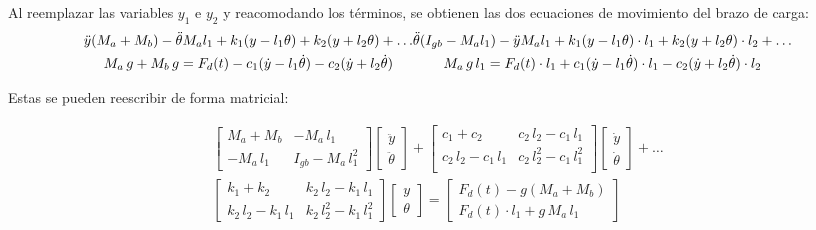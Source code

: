 \newpage

Al reemplazar las variables $y_1$ e $y_2$ y reacomodando los términos, se obtienen las dos ecuaciones de movimiento del brazo de carga:
\begin{subequations}
\begin{multline}\label{eq:mov_y}
	\ddot{y}(M_a + M_b) - \ddot{\theta}M_al_1 + k_1(y - l_1\theta) + k_2(y + l_2\theta) + \dots \\
	 M_a\, g + M_b\, g = F_d(t) - c_1(\dot{y} - l_1\dot{\theta}) - c_2(\dot{y} + l_2\dot{\theta}) 
\end{multline} 
\vspace{-17mm}
\begin{multline}\label{eq:mov_theta}
	\ddot{\theta}(I_{gb} - M_al_1) - \ddot{y}M_al_1 + k_1(y - l_1\theta)\cdot l_1 + k_2(y + l_2\theta)\cdot l_2 + \dots \\
	M_a\, g\, l_1 = F_d(t)\cdot l_1 + c_1(\dot{y} - l_1\dot{\theta})\cdot l_1 - c_2(\dot{y} + l_2\dot{\theta})\cdot l_2 
\end{multline}
\end{subequations}

Estas se pueden reescribir de forma matricial:

\begin{equation}\label{eq:mov_matriz}
\begin{split}
\begin{bmatrix}
	M_a + M_b	& -M_a\,l_1 \\
	-M_a\,l_1	& I_{gb} - M_a\,l_1^2
\end{bmatrix}
\begin{bmatrix}
	\ddot{y}\\
	\ddot{\theta}
\end{bmatrix} +
\begin{bmatrix}
	c_1 + c_2			& c_2\,l_2 - c_1\,l_1\\
	c_2\,l_2 - c_1\,l_1	& c_2\,l_2^2 - c_1\,l_1^2\\
\end{bmatrix}
\begin{bmatrix}
	\dot{y}\\
	\dot{\theta}
\end{bmatrix} + \dots \\
\begin{bmatrix}
	k_1 + k_2			& k_2\,l_2 - k_1\,l_1\\
	k_2\,l_2 - k_1\,l_1	& k_2\,l_2^2 - k_1\,l_1^2
\end{bmatrix}
\begin{bmatrix}
	y\\
	\theta
\end{bmatrix} =
\begin{bmatrix}
	F_d(t) - g(M_a + M_b)\\
	F_d(t)\cdot l_1 + g\,M_a\,l_1
\end{bmatrix}
\end{split}
\end{equation}

